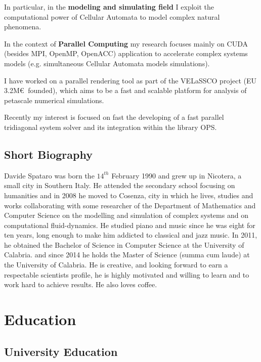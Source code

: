 \documentclass[a4paper,10pt]{article}
\begin{document}
In particular, in the \textbf{modeling and simulating field} I exploit the
computational power of Cellular Automata to model complex natural phenomena.

In the context of \textbf{Parallel Computing} my research focuses mainly on CUDA
(besides MPI, OpenMP, OpenACC) application to accelerate complex systems models
(e.g. simultaneous Cellular Automata models simulations).

I have worked on a parallel rendering tool as part of the VELaSSCO project
(EU 3.2M\euro $\:$ founded), which aims to be a  fast and scalable platform for
analysis of petascale numerical simulations.

Recently my interest is focused on fast the developing of a fast parallel tridiagonal system solver
and its integration within the library OPS.

\subsection{Short Biography}
Davide Spataro was born the $14^{th}$ February 1990 and grew up in Nicotera, a
small city in Southern Italy.
He attended the secondary school focusing on humanities and in 2008 he moved to Cosenza, city in
which he lives, studies and works collaborating with some researcher of the Department of Mathematics
and Computer Science on the modelling and simulation of complex systems and on
computational fluid-dynamics. He studied piano and music since he was eight for ten years, long enough to make him
addicted to classical and jazz music. In 2011, he obtained the Bachelor of Science in Computer Science
at the University of Calabria. and since 2014 he holds the Master of Science (summa cum laude) at
the University of Calabria. He is creative, and looking forward to earn a respectable scientists profile,
he is highly motivated and willing to learn and to work hard to achieve results. He also loves coffee.


\begin{center}
\mbox{}
\end{center}


\section{Education}

\subsection{University Education}
\end{document}
